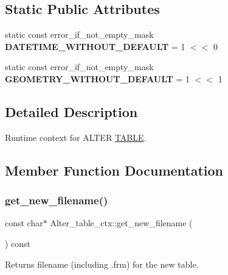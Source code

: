\subsection*{Static Public Attributes}
\begin{DoxyCompactItemize}
\item 
\mbox{\label{classAlter__table__ctx_a697893ac650b3dd290d1020632c98256}} 
static const error\+\_\+if\+\_\+not\+\_\+empty\+\_\+mask {\bfseries D\+A\+T\+E\+T\+I\+M\+E\+\_\+\+W\+I\+T\+H\+O\+U\+T\+\_\+\+D\+E\+F\+A\+U\+LT} = 1 $<$$<$ 0
\item 
\mbox{\label{classAlter__table__ctx_a8e1122be5ef252aca2a99c252ad39014}} 
static const error\+\_\+if\+\_\+not\+\_\+empty\+\_\+mask {\bfseries G\+E\+O\+M\+E\+T\+R\+Y\+\_\+\+W\+I\+T\+H\+O\+U\+T\+\_\+\+D\+E\+F\+A\+U\+LT} = 1 $<$$<$ 1
\end{DoxyCompactItemize}


\subsection{Detailed Description}
Runtime context for A\+L\+T\+ER \mbox{\hyperlink{structTABLE}{T\+A\+B\+LE}}. 

\subsection{Member Function Documentation}
\mbox{\label{classAlter__table__ctx_a2e6f3603d771c3b94d416f77fc0bf720}} 
\subsubsection{\texorpdfstring{get\+\_\+new\+\_\+filename()}{get\_new\_filename()}}
{\footnotesize\ttfamily const char$\ast$ Alter\+\_\+table\+\_\+ctx\+::get\+\_\+new\+\_\+filename (\begin{DoxyParamCaption}{ }\end{DoxyParamCaption}) const\hspace{0.3cm}{\ttfamily [inline]}}

\begin{DoxyReturn}{Returns}
filename (including .frm) for the new table. 
\end{DoxyReturn}
\mbox{\label{classAlter__table__ctx_a7158fc49d633764c5b49befcc76c6ba9}} 
